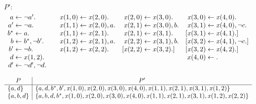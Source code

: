 \begin{Loesung}%
\rm
\begin{UList}
\item $P':{}$
\begin{equation*}
\begin{array}[t]{r@{{}\leftarrow{}}l@{\qquad}r@{{}\leftarrow{}}l@{\quad}r@{{}\leftarrow{}}l@{\quad}r@{{}\leftarrow{}}l}
a & \neg a'. %
&
\mathit{x}(1,0) & \mathit{x}(2,0).
&
\mathit{x}(2,0) & \mathit{x}(3,0).
&
\mathit{x}(3,0) & \mathit{x}(4,0).
\\
a' & \neg{a}.
&
\mathit{x}(1,1) & \mathit{x}(2,0), a.
&
\mathit{x}(2,1) & \mathit{x}(3,0), b.
&
\mathit{x}(3,1) & \mathit{x}(4,0), \neg c.
\\
b^* & a.
&
\mathit{x}(1,1) & \mathit{x}(2,1).
&
\mathit{x}(2,1) & \mathit{x}(3,1).
&
[\mathit{x}(3,1) & \mathit{x}(4,1).]
\\
b & b^*, \neg b'.
&
\mathit{x}(1,2) & \mathit{x}(2,1), a.
&
\mathit{x}(2,2) & \mathit{x}(3,1), b.
&
[\mathit{x}(3,2) & \mathit{x}(4,1), \neg c.]
\\
b' &    \neg b. 
&
\mathit{x}(1,2) & \mathit{x}(2,2).
&
[\mathit{x}(2,2) & \mathit{x}(3,2).]
&

[\mathit{x}(3,2) & \mathit{x}(4,2).]
\\
d & x(1,2). 
& \multicolumn{5}{r@{{}\leftarrow{}}}{x(4,0)} & .%
\\
d' & \neg d', \neg d.
\end{array}
\end{equation*}


\item
\begin{equation*}
\begin{array}{l|l}
\multicolumn{1}{c|}{P} & \multicolumn{1}{c}{P'}
\\\hline
\{a,d\}
&
\{a,d,b^*,b',\mathit{x}(1,0),\mathit{x}(2,0),\mathit{x}(3,0),\mathit{x}(4,0),\mathit{x}(1,1),\mathit{x}(2,1),
\mathit{x}(3,1),\mathit{x}(1,2)\}
\\
\{a,b,d\}
&
\{a,b,d,b^*,\mathit{x}(1,0),\mathit{x}(2,0),\mathit{x}(3,0),\mathit{x}(4,0),\mathit{x}(1,1),\mathit{x}(2,1),
\mathit{x}(3,1),\mathit{x}(1,2),\mathit{x}(2,2)\}
\end{array}
\end{equation*}
\end{UList}
\newpage
\end{Loesung}

